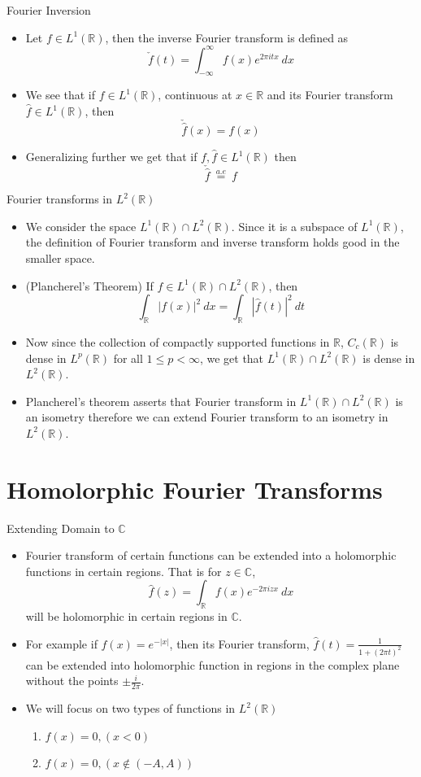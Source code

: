 \documentclass[compress]{beamer}
\newcommand{\R}{\mathbb R}
\newcommand{\C}{\mathbb C}
\begin{document}
\begin{frame}{Fourier Inversion}
  \begin{itemize}
    \item Let $f \in L^1(\R)$, then the inverse Fourier transform is defined as $$\check{f}(t) = \int_{-\infty}^\infty f(x)e^{2\pi itx} \ dx$$
    \item We see that if $f \in L^1(\R)$, continuous at $x \in \R$ and its Fourier transform $\hat{f} \in L^1(\R)$, then $$\check{\hat{f}}(x) = f(x)$$
    \item Generalizing further we get that if $f, \hat{f} \in L^1(\R)$ then $$\check{\hat{f}} \ \stackrel{a.e}{=} \ f$$
  \end{itemize}
\end{frame}

\begin{frame}{Fourier transforms in $L^2(\R)$}
  \begin{itemize}
    \item We consider the space $L^1(\R) \cap L^2(\R)$. Since it is a subspace of $L^1(\R)$, the definition of Fourier transform and inverse transform holds good in the smaller space.
    \item (Plancherel's Theorem) If $f \in L^1(\R) \cap L^2(\R)$, then $$\int_\R |f(x)|^2 \ dx = \int_\R |\hat{f}(t)|^2 \ dt$$
    \item Now since the collection of compactly supported functions in $\R$, $C_c(\R)$ is dense in $L^p(\R)$ for all $1 \le p < \infty$, we get that $L^1(\R) \cap L^2(\R)$ is dense in $L^2(\R)$.
    \item Plancherel's theorem asserts that Fourier transform in $L^1(\R) \cap L^2(\R)$ is an isometry therefore we can extend Fourier transform to an isometry in $L^2(\R)$.
  \end{itemize}
\end{frame}


\section{Homolorphic Fourier Transforms}
\begin{frame}{Extending Domain to $\C$}
  \begin{itemize}
    \item Fourier transform of certain functions can be extended into a holomorphic functions in certain regions. That is for $z \in \C$, $$\hat{f}(z) = \int_\R f(x)e^{-2\pi izx} \ dx $$
      will be holomorphic in certain regions in $\C$.
    \item For example if $f(x) = e^{-|x|}$, then its Fourier transform, $\hat{f}(t) = \frac{1}{1+(2\pi t)^2}$ can be extended into holomorphic function in regions in the complex plane without the points $\pm \frac{i}{2\pi}$.
    \item We will focus on two types of functions in $L^2(\R)$
      \begin{enumerate}
        \item $f(x) = 0, (x<0)$
        \item $f(x) = 0, (x \notin (-A, A))$
      \end{enumerate}
  \end{itemize}
\end{frame}
\end{document}
